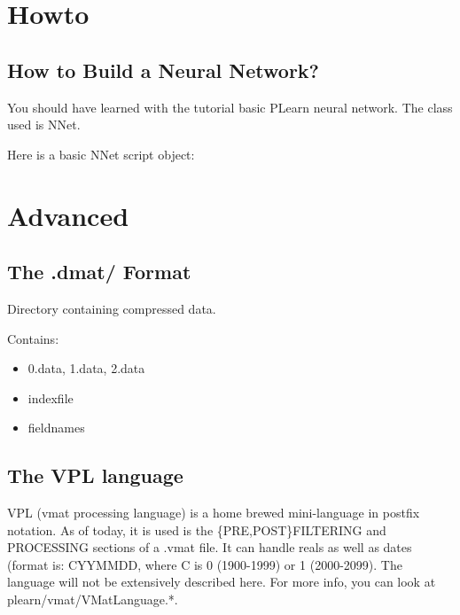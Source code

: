 \documentclass[11pt]{book}
\begin{document}
\chapter{Howto}

\section{How to Build a Neural Network?}

You should have learned with the tutorial basic PLearn neural network. The class used is NNet.

Here is a basic NNet script object:




\chapter{Advanced}

\section{The .dmat/ Format }

Directory containing compressed data.

Contains:
\begin{itemize}
\item 0.data, 1.data, 2.data
\item indexfile
\item fieldnames
\end{itemize}


\section{The VPL language}
VPL (vmat processing language) is a home brewed mini-language in postfix
notation. As of today, it is used is the \{PRE,POST\}FILT\-ERING and
PROCESSING sections of a .vmat file. It can handle reals as well as dates
(format is: CYYMMDD, where C is 0 (1900-1999) or 1 (2000-2099). The
language will not be extensively described here. For more info, you can
look at plearn/vmat/VMatLanguage.*.
\end{document}
